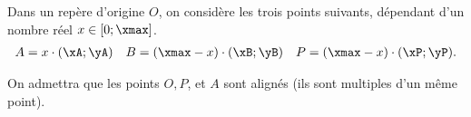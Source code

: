 

\pagestyle{fancy}
\fancyhead[R]{\today}

Dans un repère d'origine $O$, on considère les trois points suivants, dépendant d'un nombre réel $x \in [0;\xmax]$.
	\begin{align*}
		A  = x \cdot (\xA;\yA) && B = (\xmax-x)\cdot(\xB ; \yB) && P = (\xmax-x)\cdot (\xP;\yP).
	\end{align*}

On admettra que les points $O, P$, et $A$ sont alignés (ils sont multiples d'un même point).
	
	
	
%
%	
	

